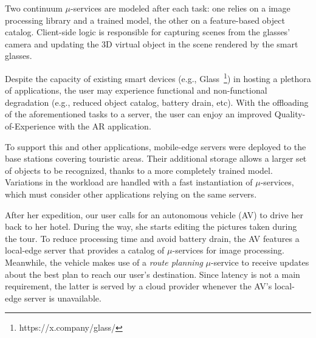Two continuum $\mu$-services are modeled after each task: one relies on a image processing library and a trained model, the other on a feature-based object catalog. Client-side logic is responsible for capturing scenes from the glasses' camera and updating the 3D virtual object in the scene rendered by the smart glasses.

Despite the capacity of existing smart devices (e.g., Glass~\footnote{https://x.company/glass/}) in hosting a plethora of applications, the user may experience functional and non-functional degradation (e.g., reduced object catalog, battery drain, etc). With the offloading of the aforementioned tasks to a server, the user can enjoy an improved Quality-of-Experience with the AR application.


To support this and other applications, mobile-edge servers were deployed to the base stations covering touristic areas. Their additional storage allows a larger set of objects to be recognized, thanks to a more completely trained model. Variations in the workload are handled with a fast instantiation of $\mu$-services, which must consider other applications relying on the same servers.


After her expedition, our user calls for an autonomous vehicle (AV) to drive her back to her hotel. During the way, she starts editing the pictures taken during the tour. To reduce processing time and avoid battery drain, the AV features a local-edge server that provides a catalog of $\mu$-services for image processing. Meanwhile, the vehicle makes use of a \textit{route planning} $\mu$-service
to receive updates about the best plan to reach our user's destination. Since latency is not a main requirement, the latter is served by a cloud provider whenever the AV's local-edge server is unavailable. 



